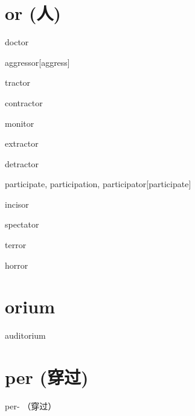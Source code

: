 \section{or (人)}


\begin{RefWord}{doctor}
\end{RefWord}

\begin{RefWord}{aggressor}[aggress]
\end{RefWord}

\begin{RefWord}{tractor}
\end{RefWord}

\begin{RefWord}{contractor}
\end{RefWord}

\begin{RefWord}{monitor}
\end{RefWord}

\begin{RefWord}{extractor}
\end{RefWord}

\begin{RefWord}{detractor}
\end{RefWord}

\begin{RefWord}{participate, participation, participator}[participate]
\end{RefWord}

\begin{RefWord}{incisor}
\end{RefWord}

\begin{RefWord}{spectator}
\end{RefWord}

\begin{RefWord}{terror}
\end{RefWord}

\begin{RefWord}{horror}
\end{RefWord}

\section{orium}

\begin{RefWord}{auditorium}
\end{RefWord}

\section{per (穿过)}
{per- （穿过）}

